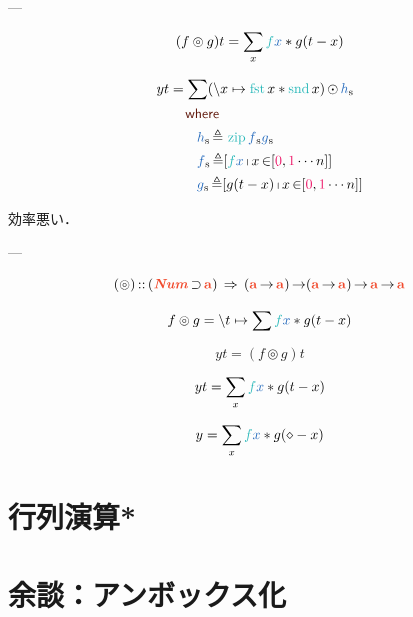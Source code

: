 \documentclass[a5paper,twoside,fleqn,draft]{jsbook}
\begin{document}

---

\begin{equation}
(f\circledcirc g)t=\sum_x\hFunc{f}\hVar{x}*g(t-x)
\end{equation}

\begin{equation}
\begin{aligned}
yt&=\sum(\hLambdaSyntax{x}{\mFst x*\mSnd x})\mMapList\mList{h}\\
&\quad\mWhere\\
&\qquad\mList{h}\mLetEq{}\mZipFunc\mList{f}\mList{g}\\
&\qquad\mList{f}\mLetEq[\hFunc{f}\hVar{x}\mListComp x\mFrom[\hConstant{0},\hConstant{1}\dotsb n]]\\
&\qquad\mList{g}\mLetEq[g(t-x)\mListComp x\mFrom[\hConstant{0},\hConstant{1}\dotsb n]]
\end{aligned}
\end{equation}

効率悪い．

---

\begin{equation}
(\circledcirc)\mIn{}(\mNumTypeClass\mSuperSet\mA )\mSuperClass{}
\mProjEXP{
  (\mProjEXP{\mA }{\mA })
}
{
  \mProjEXP{(\mProjEXP{\mA }{\mA })}
  {\mProjEXP{\mA }{\mA }}
}
\end{equation}

\begin{equation}
f\circledcirc g=\hLambdaSyntax{t}{\sum \hFunc{f}\hVar{x}*g(t-x)}
\end{equation}


$$
yt=(f\circledcirc g)t
$$


$$
yt=\sum_x\hFunc{f}\hVar{x}*g(t-x)
$$

$$
y=\sum_x\hFunc{f}\hVar{x}*g(\hAnonParam-x)
$$

\section{行列演算*}



\section{余談：アンボックス化}
\end{document}
